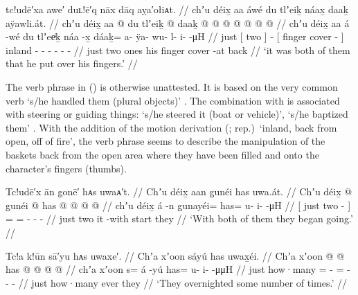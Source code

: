 \ex\label{ex:92-162-both-put-over-fingers}%
%
\begingl
	\glpreamble	tc!udē′xa awe′ duʟ!ē′q nāx dāq aỵa′ołiᴀt. //
	\glpreamble	chʼu déix̱ aa áwé du tlʼeiḵ náax̱ daaḵ aÿawli.át. //
	\gla	chʼu {} déix̱ aa {}  @ {}
		{} du tlʼeiḵ  @ {} {}
		daaḵ @  @ {} @ {} @ {} @ {} @ {} @ {} //
	\glb	chʼu {} déix̱ aa {} á -wé
		{} du tlʼeeͥḵ náa -x̱ {}
		dáaḵ= a- ÿa- wu- l- i-  -μH //
	\glc	just {}[ two  {}]  -
		{}[  finger cover - {}]
		inland - - - - -
			 - //
	\gld	just {} two ones {}  {}
		{} his finger cover -at {}
		back  {} {} {} {} {} {} //
	\glft	‘it was both of them that he put over his fingers.’
		//
\endgl
\xe

The verb phrase  in (\lastx) is otherwise unattested.
It is based on the very common verb  ‘s/he handled them (plural objects)’ \parencite[92]{leer:1976}.
The combination with  is associated with steering or guiding things:  ‘s/he steered it (boat or vehicle)’,  ‘s/he baptized them’ \parencite[95]{leer:1976}.
With the addition of the motion derivation  (;  rep.)\ ‘inland, back from open, off of fire’, the verb phrase seems to describe the manipulation of the baskets back from the open area where they have been filled and onto the character’s fingers (thumbs).

\ex\label{ex:92-163-with-both-start-going}%
%
\begingl
	\glpreamble	Tc!udē′x ān g̣onē′ hᴀs uwaᴀ′t. //
	\glpreamble	Chʼu déix̱ aan g̱unéi has uwa.át. //
	\gla	{} Chʼu déix̱  @ {} {} g̱unéi @ has @  @ {} @ {} @ {} //
	\glb	{} chʼu déix̱ á -n {}
		g̱unayéi= has= u- i-  -μH //
	\glc	{}[ just two  - {}]
		= = - -  - //
	\gld	{} just two it -with {}
		start they  {} {} {} //
	\glft	‘With both of them they began going.’
		//
\endgl
\xe

\ex\label{ex:92-164-overnighted-some}%
%
\begingl
	\glpreamble	Tc!a k!ūn sā′yu hᴀs uwaxe′. //
	\glpreamble	Chʼa xʼoon sáyú has uwax̱éi. //
	\gla	Chʼa xʼoon  @ {} @ {}
		has @  @ {} @ {} @ {} //
	\glb	chʼa xʼoon s= á -yú
		has= u- i-  -μμH //
	\glc	just how·many =  -
		= - -  - //
	\gld	just how·many ever\·  {}
		they  {} {} {} //
	\glft	‘They overnighted some number of times.’
		//
\endgl
\xe


